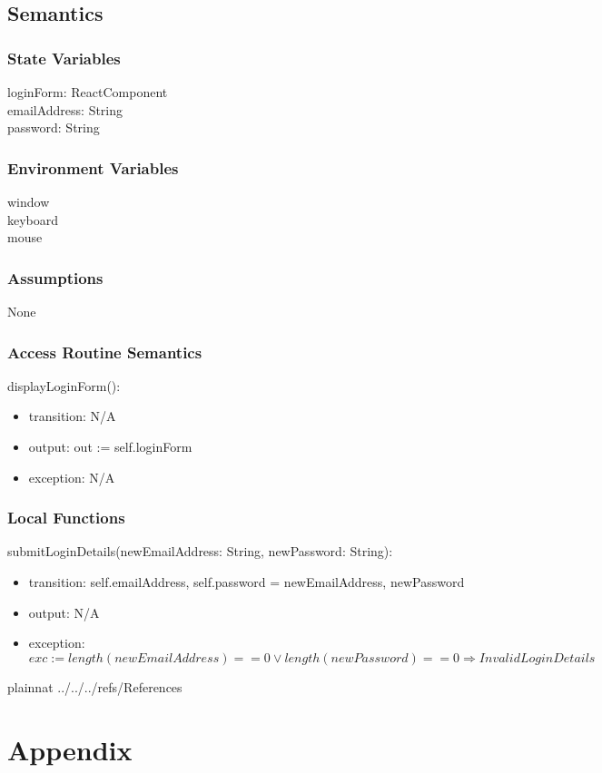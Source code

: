 \documentclass[12pt, titlepage]{article}
\begin{document}
\subsection{Semantics}

\subsubsection{State Variables}

loginForm: ReactComponent \\
emailAddress: String \\
password: String

\subsubsection{Environment Variables}

window \\
keyboard \\
mouse

\subsubsection{Assumptions}

None

\subsubsection{Access Routine Semantics}

\noindent displayLoginForm():
\begin{itemize}
\item transition: N/A
\item output: out := self.loginForm 
\item exception: N/A
\end{itemize}

\subsubsection{Local Functions}

\noindent submitLoginDetails(newEmailAddress: String, newPassword: String):
\begin{itemize}
\item transition: self.emailAddress, self.password = newEmailAddress, newPassword
\item output: N/A
\item exception: $exc := length(newEmailAddress) == 0 \vee length(newPassword) == 0 \Rightarrow InvalidLoginDetails$
\end{itemize}



\newpage

 {plainnat}
 {../../../refs/References}

\newpage

\section{Appendix} \label{Appendix}

\end{document}
